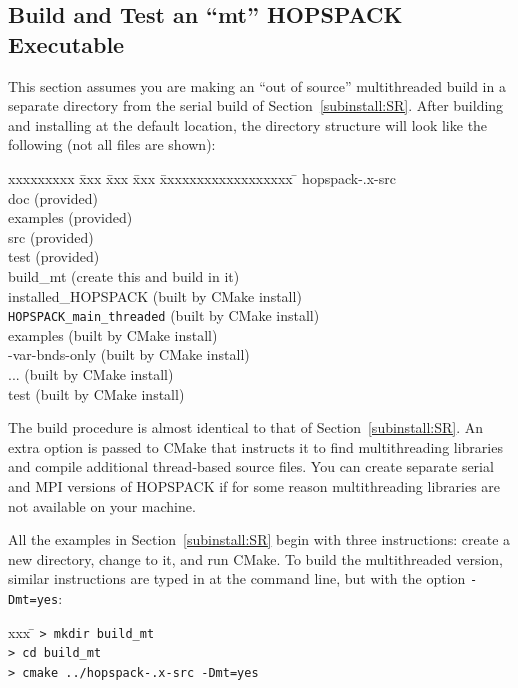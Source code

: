 \subsection{Build and Test an ``mt'' HOPSPACK Executable}
\label{subinstall:MT}

This section assumes you are making an ``out of source'' multithreaded build
in a separate directory from the serial build of Section~\ref{subinstall:SR}.
After building and installing at the default location,
the directory structure will look like the following (not all files are shown):
\vspace{-11pt}
\begin{tabbing}
  xxxxxxxxx \= xxx \= xxx \= xxx \= xxxxxxxxxxxxxxxxxx \= \kill
  \> {\sf hopspack-\HOPSVER.x-src}  \\
  \> \> {\sf doc}                      \> \> \> (provided)    \\
  \> \> {\sf examples}                 \> \> \> (provided)    \\
  \> \> {\sf src}                      \> \> \> (provided)    \\
  \> \> {\sf test}                     \> \> \> (provided)    \\
  \> {\sf build\_mt}                \> \> \> \> (create this and build in it)  \\
  \> \> {\sf installed\_HOPSPACK}      \> \> \> (built by CMake install)  \\
  \> \> \> {\tt HOPSPACK\_main\_threaded} \> \> (built by CMake install)  \\
  \> \> \> {\sf examples}                 \> \> (built by CMake install)  \\
  \> \> \> \> {-var-bnds-only}          \> (built by CMake install)  \\
  \> \> \> \> {\sf ...}                      \> (built by CMake install)  \\
  \> \> \> {\sf test}                     \> \> (built by CMake install)
\end{tabbing}

The build procedure is almost identical to that of Section~\ref{subinstall:SR}.
An extra option is passed to CMake that instructs it to find
multithreading libraries and compile additional thread-based source files.
You can create separate serial and MPI versions of HOPSPACK if for some
reason multithreading libraries are not available on your machine.

All the examples in Section~\ref{subinstall:SR} begin with three instructions:
create a new directory, change to it, and run CMake.
To build the multithreaded version, similar instructions are typed
in at the command line, but with the option {\tt -Dmt=yes}:
\vspace{-11pt}
\begin{tabbing}
  xxx \= \kill
  \> {\tt > mkdir build\_mt} \\
  \> {\tt > cd build\_mt} \\
  \> {\tt > cmake ../hopspack-\HOPSVER.x-src -Dmt=yes}
\end{tabbing}


